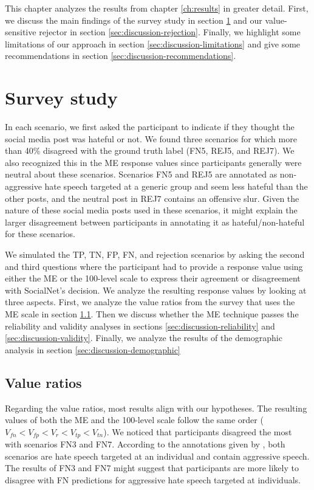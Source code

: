 %
This chapter analyzes the results from chapter \ref{ch:results} in greater detail.
%
First, we discuss the main findings of the survey study in section \ref{sec:discussion-survey} and our value-sensitive rejector in section \ref{sec:discussion-rejection}.
%
Finally, we highlight some limitations of our approach in section \ref{sec:discussion-limitations} and give some recommendations in section \ref{sec:discussion-recommendations}.


\section{Survey study}
\label{sec:discussion-survey}
%
In each scenario, we first asked the participant to indicate if they thought the social media post was hateful or not.
%
We found three scenarios for which more than 40\% disagreed with the ground truth label (FN5, REJ5, and REJ7).
%
We also recognized this in the ME response values since participants generally were neutral about these scenarios.
%
Scenarios FN5 and REJ5 are annotated as non-aggressive hate speech targeted at a generic group and seem less hateful than the other posts, and the neutral post in REJ7 contains an offensive slur.
%
Given the nature of these social media posts used in these scenarios, it might explain the larger disagreement between participants in annotating it as hateful/non-hateful for these scenarios.
%

%
We simulated the TP, TN, FP, FN, and rejection scenarios by asking the second and third questions where the participant had to provide a response value using either the ME or the 100-level scale to express their agreement or disagreement with SocialNet's decision.
%
We analyze the resulting response values by looking at three aspects.
%
First, we analyze the value ratios from the survey that uses the ME scale in section \ref{sec:discussion-value-ratios}.
%
Then we discuss whether the ME technique passes the reliability and validity analyses in sections \ref{sec:discussion-reliability} and \ref{sec:discussion-validity}.
%
Finally, we analyze the results of the demographic analysis in section \ref{sec:discussion-demographic}


\subsection{Value ratios}
\label{sec:discussion-value-ratios}
%
Regarding the value ratios, most results align with our hypotheses.
%
The resulting values of both the ME and the 100-level scale follow the same order ($V_{fn} < V_{fp} < V_{r} < V_{tp} < V_{tn}$).
%
We noticed that participants disagreed the most with scenarios FN3 and FN7.
%
According to the annotations given by \citet{basile2019semeval}, both scenarios are hate speech targeted at an individual and contain aggressive speech.
%
The results of FN3 and FN7 might suggest that participants are more likely to disagree with FN predictions for aggressive hate speech targeted at individuals.
%

